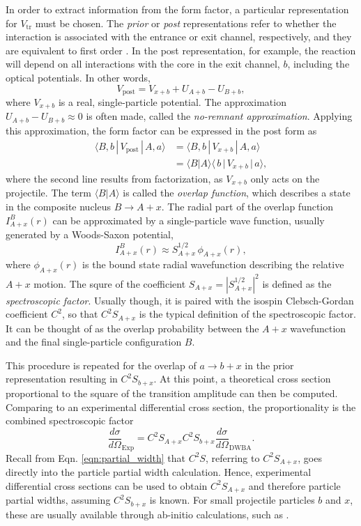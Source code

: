 In order to extract information from the form factor, a particular representation for $V_{\mathrm{tr}}$ must be chosen. The \emph{prior} or \emph{post} representations refer to whether the interaction is associated with the entrance or exit channel, respectively, and they are equivalent to first order \cite{Satchler1983}. In the post representation, for example, the reaction will depend on all interactions with the core in the exit channel, $b$, including the optical potentials. In other words,
\begin{equation}
V_{\mathrm{post}} = V_{x+b} + U_{A+b} - U_{B+b},
\end{equation}
where $V_{x+b}$ is a real, single-particle potential. The approximation $U_{A+b} - U_{B+b} \approx 0$ is often made, called the \emph{no-remnant approximation}. Applying this approximation, the form factor can be expressed in the post form as
\begin{align}
\langle B,b \, | \, V_{\mathrm{post}} \, | \, A,a \rangle &= \langle B,b \, | \, V_{x+b} \, | \, A,a \rangle \nonumber \\
&= \langle B|A \rangle \langle \, b \, | \, V_{x+b}\, | \, a \rangle,
\end{align}
where the second line results from factorization, as $V_{x+b}$ only acts on the projectile. The term $\langle B|A \rangle$ is called the \emph{overlap function}, which describes a state in the composite nucleus $B \rightarrow A + x$. The radial part of the overlap function $I^{B}_{A+x}(r)$ can be approximated by a single-particle wave function, usually generated by a Woods-Saxon potential,
\begin{equation}
I^{B}_{A+x}(r) \approx S^{1/2}_{A+x} \, \phi_{A+x}(r),
\end{equation}
where $\phi_{A+x}(r)$ is the bound state radial wavefunction describing the relative $A+x$ motion. The squre of the coefficient $S_{A+x} = |S^{1/2}_{A+x}|^{2}$ is defined as the \emph{spectroscopic factor}. Usually though, it is paired with the isospin Clebsch-Gordan coefficient $C^{2}$, so that $C^{2}S_{A+x}$ is the typical definition of the spectroscopic factor. It can be thought of as the overlap probability between the $A+x$ wavefunction and the final single-particle configuration $B$. 

This procedure is repeated for the overlap of $a \rightarrow b + x$ in the prior representation resulting in $C^{2}S_{b+x}$. At this point, a theoretical cross section proportional to the square of the transition amplitude can then be computed. Comparing to an experimental differential cross section, the proportionality is the combined spectroscopic factor
\begin{equation}
\frac{d \sigma}{d \Omega}_{\mathrm{Exp}} = C^{2}S_{A+x}C^{2}S_{b+x} \frac{d \sigma}{d \Omega}_{\mathrm{DWBA}}.
\end{equation}
Recall from Eqn. \ref{eqn:partial_width} that $C^{2}S$, referring to $C^{2}S_{A+x}$, goes directly into the particle partial width calculation. Hence, experimental differential cross sections can be used to obtain $C^{2}S_{A+x}$ and therefore particle partial widths, assuming $C^{2}S_{b+x}$ is known. For small projectile particles $b$ and $x$, these are usually available through ab-initio calculations, such as \cite{Brida2011}.
